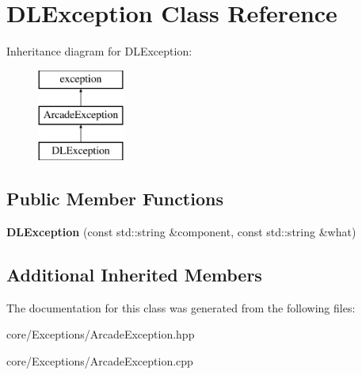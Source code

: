 \hypertarget{class_d_l_exception}{}\section{D\+L\+Exception Class Reference}
\label{class_d_l_exception}
Inheritance diagram for D\+L\+Exception\+:\begin{figure}[H]
\begin{center}
\leavevmode
\includegraphics[height=3.000000cm]{class_d_l_exception}
\end{center}
\end{figure}
\subsection*{Public Member Functions}
\begin{DoxyCompactItemize}
\item 
\mbox{\label{class_d_l_exception_ae1df8e8c9e64d1e3b2a9f36a758809a1}} 
{\bfseries D\+L\+Exception} (const std\+::string \&component, const std\+::string \&what)
\end{DoxyCompactItemize}
\subsection*{Additional Inherited Members}


The documentation for this class was generated from the following files\+:\begin{DoxyCompactItemize}
\item 
core/\+Exceptions/Arcade\+Exception.\+hpp\item 
core/\+Exceptions/Arcade\+Exception.\+cpp\end{DoxyCompactItemize}
